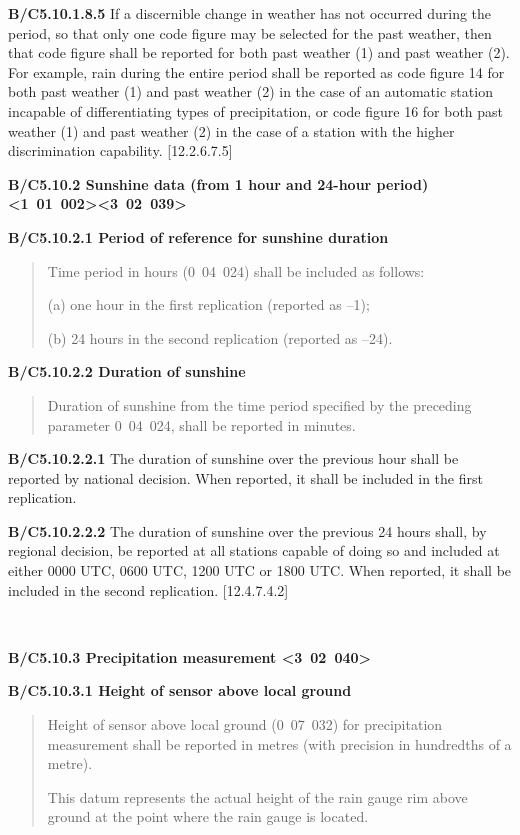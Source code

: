 \textbf{B/C5.10.1.8.5} If a discernible change in weather has not occurred during the period, so that only one code figure may be selected for the past weather, then that code figure shall be reported for both past weather (1) and past weather (2). For example, rain during the entire period shall be reported as code figure 14 for both past weather (1) and past weather (2) in the case of an automatic station incapable of differentiating types of precipitation, or code figure 16 for both past weather (1) and past weather (2) in the case of a station with the higher discrimination capability. {[}12.2.6.7.5{]}

\textbf{B/C5.10.2 Sunshine data (from 1 hour and 24-hour period) \textless1~01~002\textgreater\textless3~02~039\textgreater{}}

\textbf{B/C5.10.2.1 Period of reference for sunshine duration}

\begin{quote}
Time period in hours (0~04~024) shall be included as follows:

(a) one hour in the first replication (reported as --1);

(b) 24 hours in the second replication (reported as --24).
\end{quote}

\textbf{B/C5.10.2.2 Duration of sunshine}

\begin{quote}
Duration of sunshine from the time period specified by the preceding parameter 0~04~024, shall be reported in minutes.
\end{quote}

\textbf{B/C5.10.2.2.1} The duration of sunshine over the previous hour shall be reported by national decision. When reported, it shall be included in the first replication.

\textbf{B/C5.10.2.2.2} The duration of sunshine over the previous 24 hours shall, by regional decision, be reported at all stations capable of doing so and included at either 0000 UTC, 0600 UTC, 1200 UTC or 1800 UTC. When reported, it shall be included in the second replication. {[}12.4.7.4.2{]}

\textbf{\\
}

\textbf{B/C5.10.3 Precipitation measurement \textless3~02~040\textgreater{}}

\textbf{B/C5.10.3.1 Height of sensor above local ground}

\begin{quote}
Height of sensor above local ground (0~07~032) for precipitation measurement shall be reported in metres (with precision in hundredths of a metre).

This datum represents the actual height of the rain gauge rim above ground at the point where the rain gauge is located.
\end{quote}

